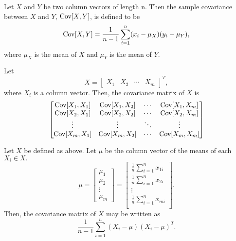 \documentclass[11pt, oneside]{article}   	%
\begin{document}
\begin{definition}
Let $X$ and $Y$ be two column vectors of length n. Then the sample covariance between $X$ and $Y$, $\text{Cov}[X,Y]$, is defined to be 
$$ \text{Cov}[X,Y] = \frac{1}{n-1} \sum_{i=1}^n (x_i - \mu_X)(y_i - \mu_Y),$$
where $\mu_X$ is the mean of $X$ and $\mu_Y$ is the mean of $Y$.
\end{definition}

\begin{definition}
Let 
$$
X = 
\begin{bmatrix}
X_1 & X_2 & \cdots & X_m
\end{bmatrix}^T,
$$
where $X_i$ is a column vector.
Then, the covariance matrix of $X$ is
$$
\begin{bmatrix}
\text{Cov}[X_1,X_1] & \text{Cov}[X_1,X_2] & \cdots & \text{Cov}[X_1, X_m]\\
\text{Cov}[X_2,X_1] & \text{Cov}[X_2, X_2] & \cdots & \text{Cov}[X_2,X_m]\\
\vdots & \vdots & \ddots & \vdots \\
\text{Cov}[X_m, X_1] & \text{Cov}[X_m,X_2] & \cdots & \text{Cov}[X_m,X_m]
\end{bmatrix}
$$
\end{definition}

\begin{lemma}
\label{lemma:covarmatrix}
Let $X$ be defined as above.
Let $\mu$ be the column vector of the means of each $X_i \in X.$
$$ \mu = 
\begin{bmatrix}
\mu_1 \\
\mu_2 \\
\vdots \\
\mu_m
\end{bmatrix}
= 
\begin{bmatrix}
\frac{1}{n} \sum_{i=1}^n x_{1i} \\[6pt]
\frac{1}{n} \sum_{i=1}^n x_{2i} \\[6pt]
\vdots\\
\frac{1}{n} \sum_{i=1}^n x_{mi} \\
\end{bmatrix}.
$$
Then, the covariance matrix of $X$ may be written as 
$$\frac{1}{n-1}\sum_{i=1}^n (X_i - \mu)(X_i-\mu)^T.$$
\end{lemma}
\end{document}
